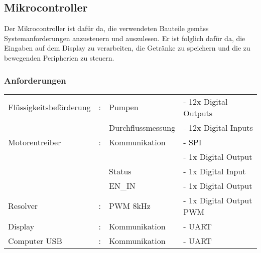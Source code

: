\subsection{Mikrocontroller}\label{subsubsec:Mikrocontroller}

Der Mikrocontroller ist dafür da, die verwendeten Bauteile gemäss Systemanforderungen anzusteuern und auszulesen. Er ist folglich dafür da, die Eingaben auf dem Display zu verarbeiten, die Getränke zu speichern und die zu bewegenden Peripherien zu steuern.

\subsubsection{Anforderungen}\label{par:Anforderungen_Mikrocontroller}

\begin{tabularx}{\textwidth}{lllX}
Flüssigkeitsbeförderung & : & Pumpen & - 12x Digital Outputs\\
 & & Durchflussmessung & - 12x Digital Inputs\\
Motorentreiber & : & Kommunikation & - SPI \\
 &  &  & - 1x Digital Output \\
 &  & Status & - 1x Digital Input \\
 &  & EN\_IN & - 1x Digital Output \\
Resolver & : & PWM 8kHz & - 1x Digital Output PWM \\
Display & : & Kommunikation & - UART \\
Computer USB & : & Kommunikation & - UART \\
\end{tabularx}

